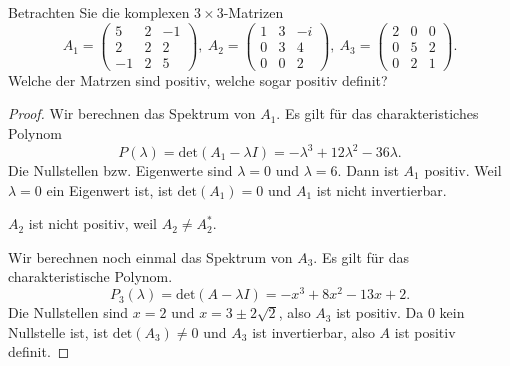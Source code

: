\begin{Problem}
	Betrachten Sie die komplexen $3\times 3$-Matrizen
	\[
		A_1=\begin{pmatrix} 5 & 2 & -1 \\ 2 & 2 & 2 \\ -1 & 2 & 5 \end{pmatrix},~A_2=\begin{pmatrix} 1 & 3 & -i \\ 0 & 3 & 4 \\ 0 & 0 & 2 \end{pmatrix},~A_3=\begin{pmatrix} 2 & 0 & 0 \\ 0 & 5 & 2 \\ 0 & 2 & 1 \end{pmatrix} 
	.\] 
	Welche der Matrzen sind positiv, welche sogar positiv definit?
\end{Problem}
\begin{proof}
	Wir berechnen das Spektrum von $A_1$. Es gilt f\"{u}r das charakteristiches Polynom
	\[
		P(\lambda)=\text{det}(A_1-\lambda I)=-\lambda^3+12\lambda^2-36\lambda
	.\] 
	Die Nullstellen bzw. Eigenwerte sind $\lambda=0$ und $\lambda=6$. Dann ist $A_1$ positiv. Weil $\lambda=0$ ein Eigenwert ist, ist $\text{det}(A_1)=0$ und $A_1$ ist nicht invertierbar. 

	$A_2$ ist nicht positiv, weil $A_2\neq A_2^*$. 

	Wir berechnen noch einmal das Spektrum von $A_3$. Es gilt f\"{u}r das charakteristische Polynom.
\[
	P_3(\lambda)=\text{det}(A-\lambda I)=-x^3+8x^2-13x+2
.\] 
Die Nullstellen sind $x=2$ und $x=3\pm 2\sqrt{2} $, also $A_3$ ist positiv. Da $0$ kein Nullstelle ist, ist $\text{det}(A_3)\neq 0$ und $A_3$ ist invertierbar, also $A$ ist positiv definit.
\end{proof}
